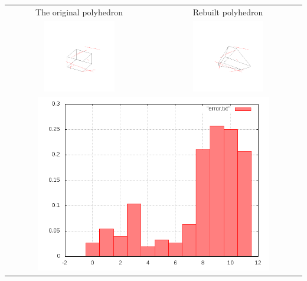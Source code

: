\documentclass[11pt,fleqn,a4paper]{scrartcl}
\begin{document}
\begin{center}

\begin{tabular}{|c|c|}
\hline
The original polyhedron& Rebuilt polyhedron \\
\includegraphics[width=0.5\textwidth]{variant2/images/12/input.png} &
\includegraphics[width=0.5\textwidth]{variant2/images/12/out.png} \\
\midrule
\multicolumn{2}{|c|}{ \includegraphics[width=0.8\textwidth]{variant2/images/12/error.png}} \\
\hline
\end{tabular}
\end{center}
\end{document}
